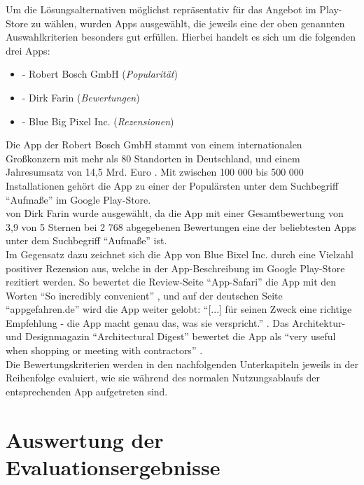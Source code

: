 Um die Lösungsalternativen möglichst repräsentativ für das Angebot im Play-Store zu wählen, wurden Apps ausgewählt, die jeweils eine der oben genannten Auswahlkriterien besonders gut erfüllen.
Hierbei handelt es sich um die folgenden drei Apps:

\begin{itemize}
  \item \mm{} - Robert Bosch GmbH (\textit{Popularität})
  \item \im{} - Dirk Farin (\textit{Bewertungen})
  \item \pm{} - Blue Big Pixel Inc. (\textit{Rezensionen})
\end{itemize}

\noindent
Die App \mm{} der Robert Bosch GmbH stammt von einem internationalen Großkonzern mit mehr als 80 Standorten in Deutschland, und einem Jahresumsatz von 14,5 Mrd. Euro \citep{Bosch18}.
Mit zwischen 100 000 bis 500 000 Installationen gehört die App zu einer der Populärsten unter dem Suchbegriff ``Aufmaße'' im Google Play-Store. \\

\im{} von Dirk Farin wurde ausgewählt, da die App mit einer Gesamtbewertung von 3,9 von 5 Sternen bei 2 768 abgegebenen Bewertungen eine der beliebtesten Apps unter dem Suchbegriff ``Aufmaße'' ist. \\

Im Gegensatz dazu zeichnet sich die App \pm{} von Blue Bixel Inc. durch eine Vielzahl positiver Rezension aus, welche in der App-Beschreibung im Google Play-Store rezitiert werden.
So bewertet die Review-Seite ``App-Safari'' die App mit den Worten ``So incredibly convenient'' \citep{AppSafari18}, und auf der deutschen Seite ``appgefahren.de'' wird die App weiter gelobt:
``[...] für seinen Zweck eine richtige Empfehlung - die App macht genau das, was sie verspricht.'' \citep{Appgefahren18}.
Das Architektur- und Designmagazin ``Architectural Digest'' bewertet die App als ``very useful when shopping or meeting with contractors'' \citep{Architect18}. \\

Die Bewertungskriterien werden in den nachfolgenden Unterkapiteln jeweils in der Reihenfolge evaluiert, wie sie während des normalen Nutzungsablaufs der entsprechenden App aufgetreten sind.




\section{Auswertung der Evaluationsergebnisse}


